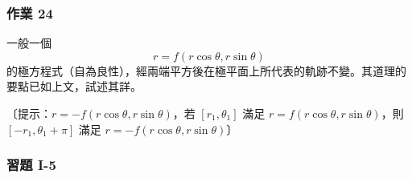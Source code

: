 \subsubsection*{作業 24}
一般一個
\[
  r = f(r\cos\theta, r\sin\theta)
\]
的極方程式（自為良性），經兩端平方後在極平面上所代表的軌跡不變。其道理的要點已如上文，試述其詳。

〔提示：$r = -f(r\cos\theta, r\sin\theta)$，若 $[r_1, \theta_1]$ 滿足 $r = f(r\cos\theta, r\sin\theta)$，則 $[-r_1, \theta_1 + \pi]$ 滿足 $r = -f(r\cos\theta, r\sin\theta)$〕

\subsubsection*{習題 I-5}
\label{sec:b5s-ex1-5}

